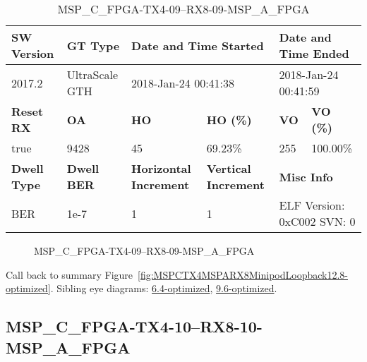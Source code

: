 \begin{table}[h]
\centering
\caption{MSP\_C\_FPGA-TX4-09--RX8-09-MSP\_A\_FPGA}
\label{tab:MSPCFPGATX409RX809MSPAFPGA12.8-optimized}
\begin{tabular}{@{}|l|l|l|l|l|l|@{}}
\toprule
\textbf{SW Version}                & \textbf{GT Type}   & \multicolumn{2}{l|}{\textbf{Date and Time Started}}            & \multicolumn{2}{l|}{\textbf{Date and Time Ended}}        \\ \midrule
2017.2                       & UltraScale GTH          & \multicolumn{2}{l|}{2018-Jan-24 00:41:38}                   & \multicolumn{2}{l|}{2018-Jan-24 00:41:59}               \\ \midrule
\textbf{Reset RX}                  & \textbf{OA} & \textbf{HO}   & \textbf{HO (\%)} & \textbf{VO} & \textbf{VO (\%)} \\ \midrule
true & 9428        & 45          & 69.23\%        & 255        & 100.00\%       \\ \midrule
\textbf{Dwell Type}                & \textbf{Dwell BER} & \textbf{Horizontal Increment} & \textbf{Vertical Increment}    & \multicolumn{2}{l|}{\textbf{Misc Info}}                  \\ \midrule
BER                            & 1e-7        & 1        & 1           & \multicolumn{2}{l|}{ELF Version: 0xC002 SVN: 0}                         \\ \bottomrule
\end{tabular}
\end{table}

\begin{figure}[h]
\caption{MSP\_C\_FPGA-TX4-09--RX8-09-MSP\_A\_FPGA} \label{fig:MSPCFPGATX409RX809MSPAFPGA12.8-optimized}
\end{figure}

Call back to summary Figure~\ref{fig:MSPCTX4MSPARX8MinipodLoopback12.8-optimized}.
Sibling eye diagrams: \hyperref[sec:MSPCFPGATX409RX809MSPAFPGA6.4-optimized]{6.4-optimized}, \hyperref[sec:MSPCFPGATX409RX809MSPAFPGA9.6-optimized]{9.6-optimized}.

\clearpage
\newpage


\subsection{MSP\_C\_FPGA-TX4-10--RX8-10-MSP\_A\_FPGA}\label{sec:MSPCFPGATX410RX810MSPAFPGA12.8-optimized}

